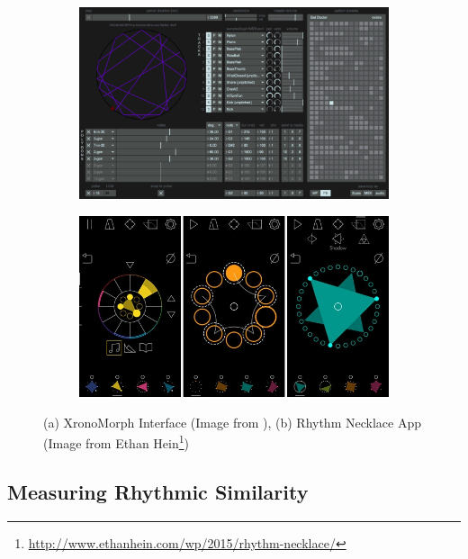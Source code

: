 \begin{figure}
\centering
\begin{subfigure}[b]{1.0\textwidth}
   \includegraphics[width=1\linewidth]{ch03_symbolic/figures/xronomorph.png}
   \caption{}
   \label{fig:Ng1} 
\end{subfigure}

\begin{subfigure}[b]{1.0\textwidth}
   \includegraphics[width=1\linewidth]{ch03_symbolic/figures/necklace2.jpg}
   \caption{}
   \label{fig:Ng2}
\end{subfigure}

\caption[Two numerical solutions]{(a) XronoMorph Interface (Image from \cite{Milne2016}), (b) Rhythm Necklace App (Image from Ethan Hein\footnote{\url{http://www.ethanhein.com/wp/2015/rhythm-necklace/}})}
\end{figure}

\subsection{Measuring Rhythmic Similarity}

